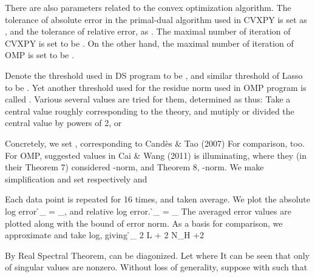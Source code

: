 There are also parameters related to the convex optimization algorithm.
The tolerance of absolute error in the primal-dual algorithm used in CVXPY is set as , and the tolerance of relative error, as .
The maximal number of iteration of CVXPY is set to be .
On the other hand, the maximal number of iteration of OMP is set to be .

Denote the threshold used in DS program to be , and similar threshold of Lasso to be .
Yet another threshold used for the residue norm used in OMP program is called \m {\eta}.
Various several values are tried for them, determined as thus: Take a central value roughly corresponding to the theory, and mutiply or divided the central value by powers of 2, or 

Concretely, we set , corresponding to Cand\`es \& Tao (2007)
For comparison,  too.
For OMP, suggested values in Cai \& Wang (2011) is illuminating, where they (in their Theorem 7) considered -norm, and Theorem 8, \m {\ell _\infty}-norm.
We make simplification and set respectively  and 

Each data point is repeated for 16 times, and taken average.
We plot the absolute log error
%
 {
\NC \h_{}
=\NC {} _{}, \NR
}
%
and relative log error.
%
 {
\NC \h_{}
=\NC {}
{ _{}} \NR
}
%
The averaged error values are plotted along with the bound of error norm.
As a basis for comparison, we approximate  and take log, giving
%
 {
\NC \h_{}
\eqsim \NC {} {2} \log L + {2} \log \log N_H +2 \NR
}

\startsubsection [title={Transformation by Diagonalization}]

By Real Spectral Theorem,  can be diagonized.
Let
where
It can be seen that only  of  singular values are nonzero.
Without loss of generality, suppose
with
such that

